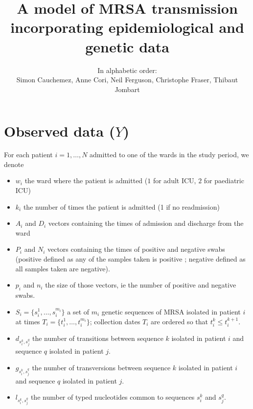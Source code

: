 \documentclass[10pt]{article}
\author{In alphabetic order: \\Simon Cauchemez, Anne Cori, Neil Ferguson, Christophe Fraser, Thibaut Jombart}
\title{A model of MRSA transmission incorporating epidemiological and genetic data}
\begin{document}
\maketitle

\section*{Observed data ($Y$)}

For each patient $i=1,\ldots,N$ admitted to one of the wards in the study period, we denote 
\begin{itemize}
	\item $w_i$ the ward where the patient is admitted ($1$ for adult ICU, $2$ for paediatric ICU)
	\item $k_i$ the number of times the patient is admitted (1 if no readmission)
	\item $A_i$ and $D_i$ vectors containing the times of admission and discharge from the ward
	\item $P_i$ and $N_i$ vectors containing the times of positive and negative swabs (positive defined as any of the samples taken is positive ; negative defined as all samples taken are negative).
	\item $p_i$ and $n_i$ the size of those vectors, ie the number of positive and negative swabs.
 	\item $S_i = \{s_i^1, \ldots, s_i^{m_i}\}$ a set of $m_i$ genetic sequences of MRSA isolated in patient $i$ at times 
$T_i = \{t_i^1, \ldots, t_i^{m_i}\}$; collection dates $T_i$ are ordered so that $t_i^k \leq t_i^{k+1}$.
 	\item $d_{s_i^k,s_j^q}$ the number of transitions between sequence $k$ isolated in patient $i$ and sequence $q$ isolated in patient $j$.
	\item $g_{s_i^k,s_j^q}$ the number of transversions between sequence $k$ isolated in patient $i$ and sequence $q$ isolated in patient $j$.
	\item $l_{s_i^k,s_j^q}$ the number of typed nucleotides common to sequences $s_i^k$ and $s_j^q$.
\end{itemize}
\end{document}
